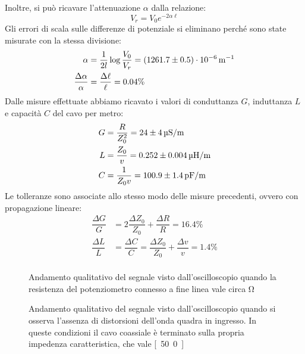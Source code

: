 \documentclass[italian,a4paper]{article}
\begin{document}
Inoltre, si può ricavare l'attenuazione $\alpha$ dalla relazione:
\begin{equation*}
V_r=V_0 e^{-2\alpha \ell}
\end{equation*}
Gli errori di scala sulle
differenze di potenziale si eliminano perch\'e sono state misurate con
la stessa divisione:
\begin{align*}
\alpha &= \dfrac{1}{2l}\log{\dfrac{V_0}{V_r}} =
\unit[(1261.7 \pm 0.5) \cdot 10^{-6}]{m^{-1}}\\
\dfrac{\Delta \alpha}{\alpha} &= \dfrac{\Delta \ell}{\ell} = 0.04 \%
\end{align*}
Dalle misure effettuate abbiamo ricavato i valori di conduttanza $G$, induttanza $L$ e capacità $C$ del cavo per metro:
\begin{align*}
G &= \dfrac{R}{Z_0^2} = \unit[24 \pm 4]{\micro S/m}\\
L &= \dfrac{Z_0}{v} = \unit[0.252 \pm 0.004]{\micro H/m}\\
C &= \dfrac{1}{Z_0v} = \unit[100.9 \pm 1.4]{pF/m}\\
\end{align*}
 Le tolleranze sono associate allo stesso modo delle misure precedenti,
 ovvero con propagazione lineare:
\begin{align*}
    \dfrac{\Delta G}{G} &= 2\dfrac{\Delta Z_0}{Z_0} + \dfrac{\Delta R}{R} =
    16.4\%\\
    \dfrac{\Delta L}{L} &= \dfrac{\Delta C}{C} = \dfrac{\Delta Z_0}{Z_0} +
    \dfrac{\Delta v}{v} = 1.4\%\\
\end{align*}
 \begin{figure}[h]
     \caption{Andamento qualitativo del segnale visto dall'oscilloscopio quando la resistenza del potenziometro connesso a fine linea vale circa \unit[30]{\ohm}}
     \begin{center}
         
     \end{center}
     \label{30ohm}
 \end{figure}
 
\begin{figure}[h]
     \caption{Andamento qualitativo del segnale visto dall'oscilloscopio quando si osserva l'assenza di distorsioni dell'onda quadra in ingresso. In queste condizioni il cavo coassiale è terminato sulla propria impedenza caratteristica, che vale \unit[50.0]{\ohm}}
     \begin{center}
         
     \end{center}
     \label{50ohm}
 \end{figure}
\end{document}
